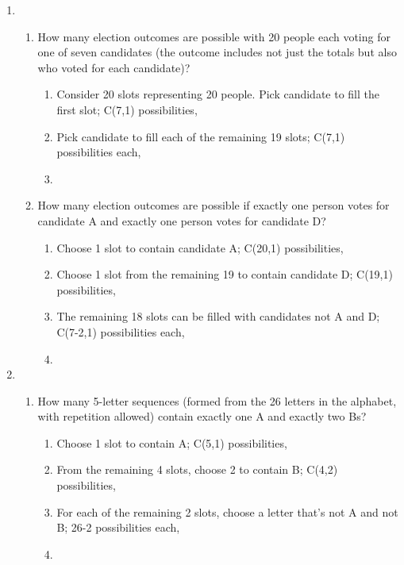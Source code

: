 \documentclass[12pt]{amsart}
\begin{document}
\begin{enumerate}
\item
  \begin{enumerate}
  \item How many election outcomes are possible with 20 people each voting for
one of seven candidates (the outcome includes not just the totals but also
who voted for each candidate)?
    \begin{enumerate}
        \item Consider 20 slots representing 20 people. Pick candidate to fill the first slot; C(7,1) possibilities,
        \item Pick candidate to fill each of the remaining 19 slots; C(7,1) possibilities each,
        \item {}
    \end{enumerate}
  \item How many election outcomes are possible if exactly one person votes for
candidate A and exactly one person votes for candidate D?
    \begin{enumerate}
        \item Choose 1 slot to contain candidate A; C(20,1) possibilities,
        \item Choose 1 slot from the remaining 19 to contain candidate D; C(19,1) possibilities,
        \item The remaining 18 slots can be filled with candidates not A and D; C(7-2,1) possibilities each,
        \item {}
    \end{enumerate}
  \end{enumerate}


\item \begin{enumerate}
    \item How many 5-letter sequences (formed from the 26 letters in the alphabet, with
repetition allowed) contain exactly one A and exactly two Bs?
        \begin{enumerate}
            \item Choose 1 slot to contain A; C(5,1) possibilities,
            \item From the remaining 4 slots, choose 2 to contain B; C(4,2) possibilities,
            \item For each of the remaining 2 slots, choose a letter that's not A and not B; 26-2 possibilities each,
            \item {}
        \end{enumerate}
\end{enumerate}



\end{enumerate}
\end{document}
